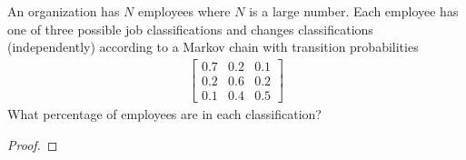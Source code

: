 \begin{problem}{4.29}
  An organization has $N$ employees where $N$ is a large number. Each employee
  has one of three possible job classifications and changes classifications (independently)
  according to a Markov chain with transition probabilities
  \begin{align*}
    \begin{bmatrix}
      0.7 & 0.2 & 0.1 \\
      0.2 & 0.6 & 0.2 \\
      0.1 & 0.4 & 0.5
    \end{bmatrix}
  \end{align*}
  What percentage of employees are in each classification?
\end{problem}

\begin{proof}
\end{proof}
\newpage
